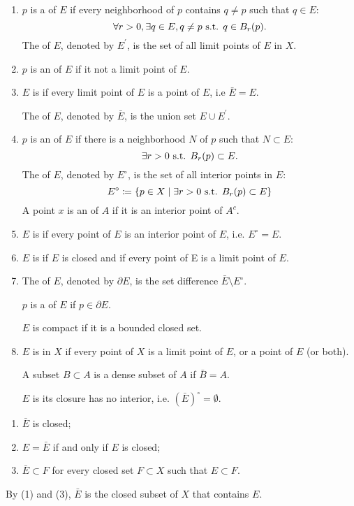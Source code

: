\begin{definition}
\begin{enumerate}[label=(\arabic*)]
\item $p$ is a  of $E$ if every neighborhood of $p$ contains $q\neq p$ such that $q\in E$:
\[ \forall r>0,\exists q\in E, q\neq p\text{ s.t. } q\in B_r(p). \]
The  of $E$, denoted by $E^\prime$, is the set of all limit points of $E$ in $X$.
\item $p$ is an  of $E$ if it not a limit point of $E$.
\item $E$ is  if every limit point of $E$ is a point of $E$, i.e $\bar{E}=E$.

The  of $E$, denoted by $\bar{E}$, is the union set $E\cup E^\prime$.

\item $p$ is an  of $E$ if there is a neighborhood $N$ of $p$ such that $N\subset E$:
\[ \exists r>0 \text{ s.t. } B_r(p)\subset E. \]
The  of $E$, denoted by $E^\circ$, is the set of all interior points in $E$:
\[E^\circ\coloneqq\{p\in X\mid \exists r>0 \text{ s.t. } B_r(p)\subset E\}\]
A point $x$ is an  of $A$ if it is an interior point of $A^c$.
\item $E$ is  if every point of $E$ is an interior point of $E$, i.e. $E^\circ=E$.
\item $E$ is  if $E$ is closed and if every point of E is a limit point of $E$.
\item The  of $E$, denoted by $\partial E$, is the set difference $\bar{E}\setminus E^\circ$.

$p$ is a  of $E$ if $p\in\partial E$.

$E$ is compact if it is a bounded closed set.
\item $E$ is  in $X$ if every point of $X$ is a limit point of $E$, or a point of $E$ (or both). 

A subset $B\subset A$ is a dense subset of $A$ if $\bar{B}=A$.

$E$ is  its closure has no interior, i.e. $(\bar{E})^\circ=\emptyset$.
\end{enumerate}
\end{definition}





\begin{proposition}
\begin{enumerate}[label=(\arabic*)]
\item $\bar{E}$ is closed;
\item $E=\bar{E}$ if and only if $E$ is closed;
\item $\bar{E}\subset F$ for every closed set $F\subset X$ such that $E\subset F$.
\end{enumerate}
By (1) and (3), $\bar{E}$ is the  closed subset of $X$ that contains $E$.
\end{proposition}

